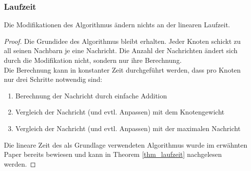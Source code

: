 \subsubsection{Laufzeit}
	
	\begin{theorem}\label{thm_laufzeit_modifikation}
		Die Modifikationen des Algorithmus ändern nichts an der linearen Laufzeit.
	\end{theorem}
	\begin{proof}
		Die Grundidee des Algorithmus bleibt erhalten. Jeder Knoten schickt zu all seinen Nachbarn je eine Nachricht. Die Anzahl der Nachrichten ändert sich durch die Modifikation nicht, sondern nur ihre Berechnung.\\Die Berechnung kann in konstanter Zeit durchgeführt werden, dass pro Knoten nur drei Schritte notwendig sind:
		\begin{enumerate}
			\item Berechnung der Nachricht durch einfache Addition
			\item Vergleich der Nachricht (und evtl. Anpassen) mit dem Knotengewicht
			\item Vergleich der Nachricht (und evtl. Anpassen) mit der maximalen Nachricht
		\end{enumerate}
		Die lineare Zeit des als Grundlage verwendeten Algorithmus wurde im erwähnten Paper \cite{cima_paper} bereits bewiesen und kann in Theorem \ref{thm_laufzeit} nachgelesen werden.
	\end{proof}



